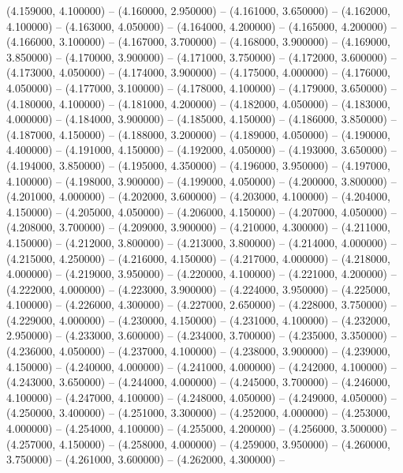 (4.159000, 4.100000) -- 
(4.160000, 2.950000) -- 
(4.161000, 3.650000) -- 
(4.162000, 4.100000) -- 
(4.163000, 4.050000) -- 
(4.164000, 4.200000) -- 
(4.165000, 4.200000) -- 
(4.166000, 3.100000) -- 
(4.167000, 3.700000) -- 
(4.168000, 3.900000) -- 
(4.169000, 3.850000) -- 
(4.170000, 3.900000) -- 
(4.171000, 3.750000) -- 
(4.172000, 3.600000) -- 
(4.173000, 4.050000) -- 
(4.174000, 3.900000) -- 
(4.175000, 4.000000) -- 
(4.176000, 4.050000) -- 
(4.177000, 3.100000) -- 
(4.178000, 4.100000) -- 
(4.179000, 3.650000) -- 
(4.180000, 4.100000) -- 
(4.181000, 4.200000) -- 
(4.182000, 4.050000) -- 
(4.183000, 4.000000) -- 
(4.184000, 3.900000) -- 
(4.185000, 4.150000) -- 
(4.186000, 3.850000) -- 
(4.187000, 4.150000) -- 
(4.188000, 3.200000) -- 
(4.189000, 4.050000) -- 
(4.190000, 4.400000) -- 
(4.191000, 4.150000) -- 
(4.192000, 4.050000) -- 
(4.193000, 3.650000) -- 
(4.194000, 3.850000) -- 
(4.195000, 4.350000) -- 
(4.196000, 3.950000) -- 
(4.197000, 4.100000) -- 
(4.198000, 3.900000) -- 
(4.199000, 4.050000) -- 
(4.200000, 3.800000) -- 
(4.201000, 4.000000) -- 
(4.202000, 3.600000) -- 
(4.203000, 4.100000) -- 
(4.204000, 4.150000) -- 
(4.205000, 4.050000) -- 
(4.206000, 4.150000) -- 
(4.207000, 4.050000) -- 
(4.208000, 3.700000) -- 
(4.209000, 3.900000) -- 
(4.210000, 4.300000) -- 
(4.211000, 4.150000) -- 
(4.212000, 3.800000) -- 
(4.213000, 3.800000) -- 
(4.214000, 4.000000) -- 
(4.215000, 4.250000) -- 
(4.216000, 4.150000) -- 
(4.217000, 4.000000) -- 
(4.218000, 4.000000) -- 
(4.219000, 3.950000) -- 
(4.220000, 4.100000) -- 
(4.221000, 4.200000) -- 
(4.222000, 4.000000) -- 
(4.223000, 3.900000) -- 
(4.224000, 3.950000) -- 
(4.225000, 4.100000) -- 
(4.226000, 4.300000) -- 
(4.227000, 2.650000) -- 
(4.228000, 3.750000) -- 
(4.229000, 4.000000) -- 
(4.230000, 4.150000) -- 
(4.231000, 4.100000) -- 
(4.232000, 2.950000) -- 
(4.233000, 3.600000) -- 
(4.234000, 3.700000) -- 
(4.235000, 3.350000) -- 
(4.236000, 4.050000) -- 
(4.237000, 4.100000) -- 
(4.238000, 3.900000) -- 
(4.239000, 4.150000) -- 
(4.240000, 4.000000) -- 
(4.241000, 4.000000) -- 
(4.242000, 4.100000) -- 
(4.243000, 3.650000) -- 
(4.244000, 4.000000) -- 
(4.245000, 3.700000) -- 
(4.246000, 4.100000) -- 
(4.247000, 4.100000) -- 
(4.248000, 4.050000) -- 
(4.249000, 4.050000) -- 
(4.250000, 3.400000) -- 
(4.251000, 3.300000) -- 
(4.252000, 4.000000) -- 
(4.253000, 4.000000) -- 
(4.254000, 4.100000) -- 
(4.255000, 4.200000) -- 
(4.256000, 3.500000) -- 
(4.257000, 4.150000) -- 
(4.258000, 4.000000) -- 
(4.259000, 3.950000) -- 
(4.260000, 3.750000) -- 
(4.261000, 3.600000) -- 
(4.262000, 4.300000) -- 
